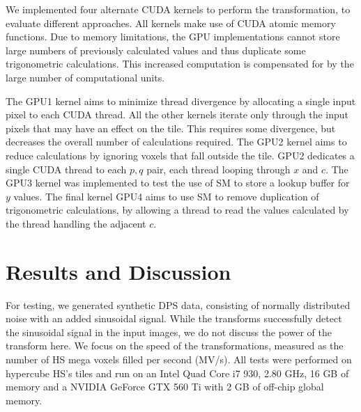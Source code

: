We implemented four alternate CUDA kernels to perform the transformation, to evaluate different approaches.
All kernels make use of CUDA atomic memory functions.
Due to memory limitations, the GPU implementations cannot store large numbers of previously calculated values and thus duplicate some trigonometric calculations.
This increased computation is compensated for by the large number of computational units.

The GPU1 kernel aims to minimize thread divergence by allocating a single input pixel to each CUDA thread.
All the  other kernels iterate only through the input pixels that may have an effect on the tile.
This requires some divergence, but decreases the overall number of calculations required.
The GPU2 kernel aims to reduce calculations by ignoring voxels that fall outside the tile.
GPU2 dedicates a single CUDA thread to each $p,q$ pair, each thread looping through $x$ and $c$.
The GPU3 kernel was implemented to test the use of SM to store a lookup buffer for $y$ values.
The final kernel GPU4 aims to use SM to remove duplication of trigonometric calculations, by allowing a thread to read the values calculated by the thread handling the adjacent $c$.

\section{Results and Discussion}
\label{eval}

For testing, we generated synthetic DPS data, consisting of normally distributed noise with an added sinusoidal signal.
While the transforms successfully detect the sinusoidal signal in the input images, we do not discuss the power of the transform here.
We focus on the speed of the transformations, measured as the number of HS mega voxels filled per second (MV/s).  
All tests were performed on hypercube HS's tiles and run on an Intel Quad Core i7 930, 2.80 GHz, 16 GB of memory and a NVIDIA GeForce GTX 560 Ti with 2 GB of off-chip global memory.

